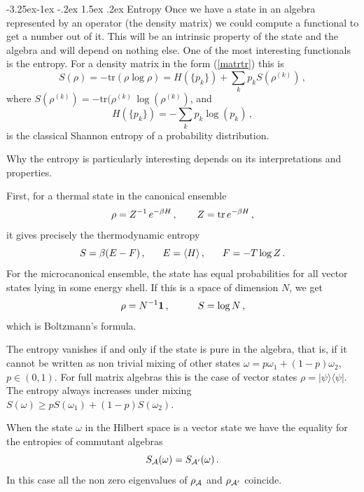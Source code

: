 \documentclass[11pt]{article}
\makeatletter
\renewcommand\subsection{\@startsection{subsection}{2}{\z@}%
                                   {-3.25ex\@plus -1ex \@minus -.2ex}%
                                     {1.5ex \@plus .2ex}%
                                     {\normalfont\bfseries}}
\numberwithin{equation}{section}
\newcommand{\be}{\begin{equation}}
\newcommand{\ee}{\end{equation}}
\makeatother
\begin{document}
\subsection{Entropy}
Once we have a state in an algebra represented by an operator (the density matrix) we could compute a functional to get a number out of it. This will be an intrinsic property of the state and the algebra and will depend on nothing else. One of the most interesting functionals is the entropy. For a density matrix in the form (\ref{matrtr}) this is   
\begin{equation}
S(\rho)=-\textrm{tr}(\rho\log \rho)=H(\{p_k\})+\sum_k p_k S(\rho^{(k)})\,,
\end{equation}
where $S(\rho^{(k)})=-\textrm{tr}(\rho^{(k)} \, \log(\rho^{(k)})$, and
\begin{equation}
H(\{p_k\})=-\sum_k p_k \log(p_k)\,,
\end{equation}
is the classical Shannon entropy of a probability distribution. 

Why the entropy is particularly interesting depends on its interpretations and properties. 

First, for a thermal state in the canonical ensemble 
\be
\rho=Z^{-1}\, e^{-\beta H}\,,\hspace{.7cm} Z=\textrm{tr} \, e^{-\beta H}\,,
\ee
it gives precisely the thermodynamic entropy
\be 
S= \beta (E-F) \,,\hspace{.6cm} E= \langle H\rangle\,,\hspace{.6cm} F=-T \log Z\,.
\ee
For the microcanonical ensemble, the state has equal probabilities for all vector states lying in some energy shell. If this is a space of dimension $N$, we get
\be
\rho= N^{-1} {\bf 1}\,,\hspace{1cm} S=\log N\,,
\ee
which is Boltzmann's formula. 

The entropy vanishes if and only if the state is pure in the algebra, that is, if it cannot be written as non trivial mixing of other states $\omega= p \omega_1+(1-p) \omega_2$, $p\in (0,1)$. For full matrix algebras this is the case of vector states $\rho=|\psi\rangle \langle\psi|$. The entropy always increases under mixing $S(\omega)\ge  p S(\omega_1)+(1-p) S(\omega_2)$. 

When the state $\omega$ in the Hilbert space is a vector state we have the equality for the entropies of commutant algebras 
\begin{equation}
S_{{\cal A}}(\omega)=S_{{\cal A}'}(\omega)\,.
\end{equation}
In this case all the non zero eigenvalues of $\rho_{\cal A}$ and $\rho_{{\cal A}'}$ coincide.
\end{document}

